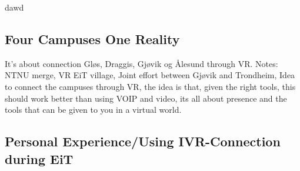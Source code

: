     dawd
    \subsection{Four Campuses One Reality}
    It's about connection Gløs, Draggis, Gjøvik og Ålesund through VR.
    Notes: NTNU merge, VR EiT village, Joint effort between Gjøvik and Trondheim, Idea to connect the campuses through VR, the idea is that, given the right tools, this should work better than using VOIP and video, its all about presence and the tools that can be given to you in a virtual world.
    \subsection{Personal Experience/Using IVR-Connection during EiT}
    
